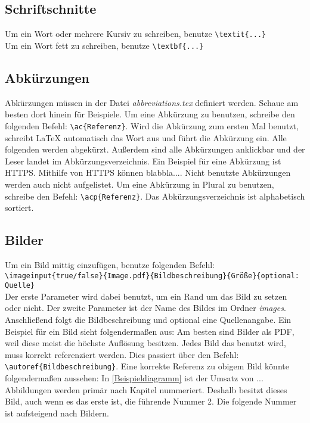 \subsection{Schriftschnitte}
    Um ein Wort oder mehrere Kursiv zu schreiben, benutze \verb|\textit{...}|\\
    Um ein Wort fett zu schreiben, benutze \verb|\textbf{...}|

\subsection{Abkürzungen}
    Abkürzungen müssen in der Datei \textit{abbreviations.tex} definiert werden. Schaue am besten dort hinein für Beispiele. Um eine Abkürzung zu benutzen, schreibe den folgenden Befehl: \verb|\ac{Referenz}|. Wird die Abkürzung zum ersten Mal benutzt, schreibt LaTeX automatisch das Wort aus und führt die Abkürzung ein. Alle folgenden werden abgekürzt. Außerdem sind alle Abkürzungen anklickbar und der Leser landet im Abkürzungsverzeichnis. Ein Beispiel für eine Abkürzung ist \ac{HTTPS}. Mithilfe von \ac{HTTPS} können blabbla.... Nicht benutzte Abkürzungen werden auch nicht aufgelistet. Um eine Abkürzung in Plural zu benutzen, schreibe den Befehl: \verb|\acp{Referenz}|. Das Abkürzungsverzeichnis ist alphabetisch sortiert.

\subsection{Bilder}
    Um ein Bild mittig einzufügen, benutze folgenden Befehl:\\
    \verb|\imageinput{true/false}{Image.pdf}{Bildbeschreibung}{Größe}{optional: Quelle}|\\
    Der erste Parameter wird dabei benutzt, um ein Rand um das Bild zu setzen oder nicht. Der zweite Parameter ist der Name des Bildes im Ordner \textit{images}. Anschließend folgt die Bildbeschreibung und optional eine Quellenangabe. Ein Beispiel für ein Bild sieht folgendermaßen aus:
    Am besten sind Bilder als PDF, weil diese meist die höchste Auflösung besitzen. Jedes Bild das benutzt wird, muss korrekt referenziert werden. Dies passiert über den Befehl: \verb|\autoref{Bildbeschreibung}|. Eine korrekte Referenz zu obigem Bild könnte folgendermaßen aussehen: In \autoref{Beispieldiagramm} ist der Umsatz von ...\\
    Abbildungen werden primär nach Kapitel nummeriert. Deshalb besitzt dieses Bild, auch wenn es das erste ist, die führende Nummer 2. Die folgende Nummer ist aufsteigend nach Bildern.

